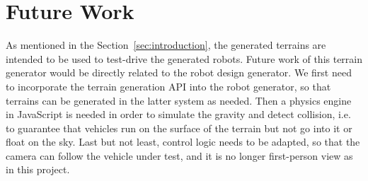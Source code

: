 \section{Future Work} 
\label{sec:future_work}
As mentioned in the Section~\ref{sec:introduction}, the generated terrains are intended to be used to test-drive the generated robots. Future work of this terrain generator would be directly related to the robot design generator. We first need to incorporate the terrain generation API into the robot generator, so that terrains can be generated in the latter system as needed. Then a physics engine in JavaScript is needed in order to simulate the gravity and detect collision, i.e. to guarantee that vehicles run on the surface of the terrain but not go into it or float on the sky. Last but not least, control logic needs to be adapted, so that the camera can follow the vehicle under test, and it is no longer first-person view as in this project.

